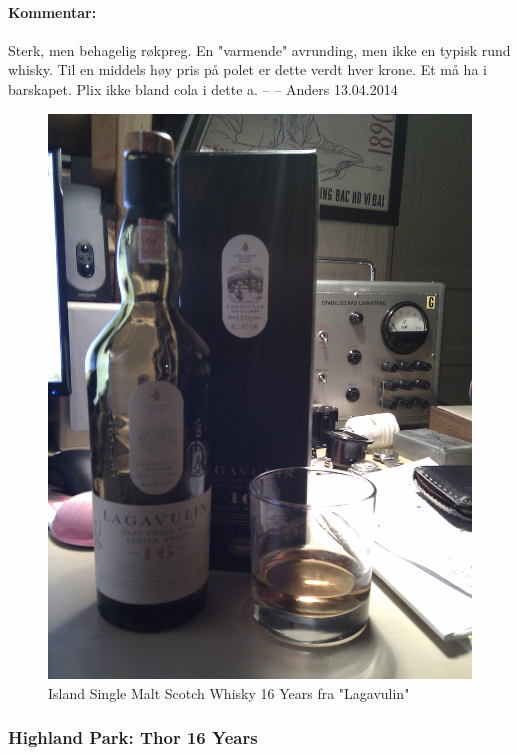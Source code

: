 \documentclass[12pt,a4paper,oneside,norsk]{article}
\begin{document}
\paragraph{Kommentar:}Sterk, men behagelig røkpreg. En "varmende" avrunding, men ikke en typisk rund whisky. Til en middels høy pris på polet er dette verdt hver krone. Et må ha i barskapet. Plix ikke bland cola i dette a.
\newline
-- -- Anders 13.04.2014

\begin{figure} [H]
\centering
\includegraphics[scale=0.1, angle=0]{Bilder/Sprit/Lagavulin16aar.jpg}
\caption{Island Single Malt Scotch Whisky 16 Years fra "Lagavulin"}
\end{figure}

\newpage
\subsubsection{Highland Park: Thor 16 Years}
\end{document}
